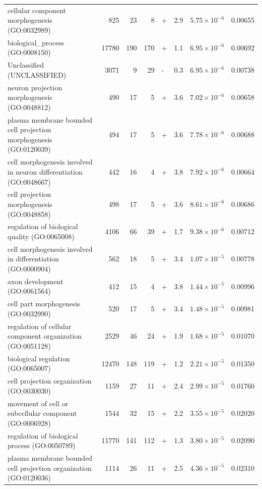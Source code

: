 \begin{table}[ht]
\begin{adjustbox}{width=\textwidth}
\begin{tabular}{lrrrlrrr}
  cellular component morphogenesis (GO:0032989) & 825 & 23 & 8 & + & 2.9 & $5.75 \times 10^{-6}$ & 0.00655 \\ 
  biological\_process (GO:0008150) & 17780 & 190 & 170 & + & 1.1 & $6.95 \times 10^{-6}$ & 0.00692 \\ 
  Unclassified (UNCLASSIFIED) & 3071 & 9 & 29 & - & 0.3 & $6.95 \times 10^{-6}$ & 0.00738 \\ 
  neuron projection morphogenesis (GO:0048812) & 490 & 17 & 5 & + & 3.6 & $7.02 \times 10^{-6}$ & 0.00658 \\ 
  plasma membrane bounded cell projection morphogenesis (GO:0120039) & 494 & 17 & 5 & + & 3.6 & $7.78 \times 10^{-6}$ & 0.00688 \\ 
  cell morphogenesis involved in neuron differentiation (GO:0048667) & 442 & 16 & 4 & + & 3.8 & $7.92 \times 10^{-6}$ & 0.00664 \\ 
  cell projection morphogenesis (GO:0048858) & 498 & 17 & 5 & + & 3.6 & $8.61 \times 10^{-6}$ & 0.00686 \\ 
  regulation of biological quality (GO:0065008) & 4106 & 66 & 39 & + & 1.7 & $9.38 \times 10^{-6}$ & 0.00712 \\ 
  cell morphogenesis involved in differentiation (GO:0000904) & 562 & 18 & 5 & + & 3.4 & $1.07 \times 10^{-5}$ & 0.00778 \\ 
  axon development (GO:0061564) & 412 & 15 & 4 & + & 3.8 & $1.44 \times 10^{-5}$ & 0.00996 \\ 
  cell part morphogenesis (GO:0032990) & 520 & 17 & 5 & + & 3.4 & $1.48 \times 10^{-5}$ & 0.00981 \\ 
  regulation of cellular component organization (GO:0051128) & 2529 & 46 & 24 & + & 1.9 & $1.68 \times 10^{-5}$ & 0.01070 \\ 
  biological regulation (GO:0065007) & 12470 & 148 & 119 & + & 1.2 & $2.21 \times 10^{-5}$ & 0.01350 \\ 
  cell projection organization (GO:0030030) & 1159 & 27 & 11 & + & 2.4 & $2.99 \times 10^{-5}$ & 0.01760 \\ 
  movement of cell or subcellular component (GO:0006928) & 1544 & 32 & 15 & + & 2.2 & $3.55 \times 10^{-5}$ & 0.02020 \\ 
  regulation of biological process (GO:0050789) & 11770 & 141 & 112 & + & 1.3 & $3.80 \times 10^{-5}$ & 0.02090 \\ 
  plasma membrane bounded cell projection organization (GO:0120036) & 1114 & 26 & 11 & + & 2.5 & $4.36 \times 10^{-5}$ & 0.02310 \\ 

\end{tabular}
\end{adjustbox}
\end{table}
